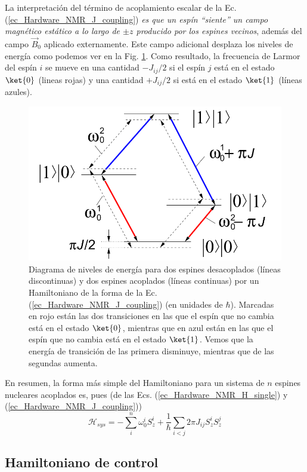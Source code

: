 \begin{itemize}
La interpretación del término de acoplamiento escalar de la Ec. (\ref{ec_Hardware_NMR_J_coupling})\textit{ es que un espín ``siente'' un campo magnético estático a lo largo de $\pm z$ producido por los espines vecinos}, además del campo $\vec{B}_0$ aplicado externamente. Este campo adicional desplaza los niveles de energía como podemos ver en la Fig. \ref{Fig_Harware_NMR_diagrama}. Como resultado, la frecuencia de Larmor del espín $i$ se mueve en una cantidad $-J_{ij}/2$ si el espín $j$ está en el estado $\ket{0}$ (lineas rojas) y una cantidad $+J_{ij}/2$ si está en el estado $\ket{1}$ (líneas azules).  

	\begin{figure}[H]
	\centering 
	\includegraphics[width=0.4\linewidth]{Figuras/Fig_Harware_NMR_diagrama.png}
	\caption{Diagrama de niveles de energía para dos espines desacoplados (líneas discontinuas) y dos espines acoplados (líneas continuas) por un Hamiltoniano de la forma de la Ec.	(\ref{ec_Hardware_NMR_J_coupling}) (en unidades de $\hbar$). Marcadas en rojo están las dos transiciones en las que el espín que no cambia está en el estado $\ket{0}$, mientras que en azul están en las que el espín que no cambia está en el estado $\ket{1}$. Vemos que la energía de transición de las primera disminuye, mientras que de las segundas aumenta.}
	\label{Fig_Harware_NMR_diagrama}
	\end{figure}

\end{itemize}


En resumen, la forma más simple del Hamiltoniano para un sistema de $n$ espines nucleares acoplados es, pues (de las Ecs. (\ref{ec_Hardware_NMR_H_single}) y (\ref{ec_Hardware_NMR_J_coupling}))
	\begin{equation} \label{ec_Hardware_NMR_H_sys_final}
	\boxed{\mathcal{H}_{sys} = - \sum_{i}^n \omega_0^i S_z^{i}  + \frac{1}{\hbar} \sum_{i<j} 2 \pi J_{ij} S_z^i S_z^j}
	\end{equation}
	

		\subsection{Hamiltoniano de control} \label{sec_subsub_Harware_NMR_H_control}

